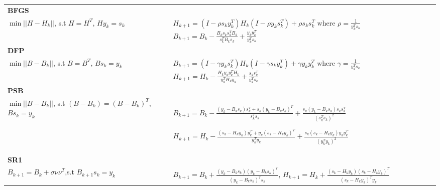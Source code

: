 \documentclass[a0]{a0poster}
\newcommand{\lt}{\left}
\newcommand{\rt}{\right}
\newcommand{\fr}{\frac}
\begin{document}
\begin{textblock}{7.0}
\begin{flushleft}
\begin{tabular}{ p{10cm} p{16cm} }
		\multicolumn{2}{l}{\textbf{BFGS}} \\
		
		$\min||H-H_k||$, \newline s.t $H=H^T$, $Hy_k=s_k$ & $H_{k+1} =(I-\rho s_k y_k^T)H_k(I-\rho y_k s_k ^T) + \rho s_k s_k^T$  
															\newline where $\rho = \fr{1}{y_k^Ts_k}$
															\newline $B_{k+1} = B_k - \fr{B_ks_ks_k^TB_k}{s_k^TB_ks_k} + \fr{y_ky_k^T}{y_k^Ts_k}$\\ 
		\multicolumn{2}{l}{\textbf{DFP}} \\
		$\min||B-B_k||$, \newline s.t $B=B^T$, $Bs_k=y_k$& $B_{k+1} =(I-\gamma y_k s_k^T)H_k(I-\gamma  s_k y_k ^T) + \gamma y_k y_k^T$	\newline where $\gamma = \fr{1}{y_k^Ts_k}$
		\newline $H_{k+1} = H_k - \fr{H_k y_k y_k^TH_k}{y_k^T H_k y_k} + \fr{s_k s_k^T}{y_k^Ts_k}$\\
		\multicolumn{2}{l}{\textbf{PSB}} \\
		$\min||B-B_k||$, \newline s.t $\lt(B - B_k\rt)=\lt(B - B_k\rt)^T$, \newline$Bs_k=y_k$&
		$B_{k+1} = B_k - \fr{(y_k - B_ks_k)s_k^T + s_k(y_k - B_ks_k)^T}{s_k^Ts_k} + \fr{s_k(y_k - B_ks_k) s_k s_k^T}{(s_k^Ts_k)^2}$
		
		$H_{k+1} = H_k - \fr{(s_k - H_ky_k)y_k^T + y_k(s_k - H_ky_k)^T}{y_k^Ty_k} + \fr{s_k(s_k - H_ky_k) y_k y_k^T}{(y_k^Ty_k)^2}$\\ 
		\multicolumn{2}{l}{\textbf{SR1}} \\
		$B_{k+1} = B_k + \sigma\nu\nu^T$,\newline s.t $B_{k+1}s_k = y_k$&
		$B_{k+1} = B_k + \fr{(y_k - B_ks_k)(y_k - B_ks_k)^T}{(y_k - B_ks_k)^Ts_k}$,\newline
		$H_{k+1} = H_k + \fr{(s_k - H_ky_k)(s_k - H_k y_k)^T}{(s_k - H_ky_k)^Ty_k}$
	\end{tabular}
\end{flushleft}
\end{textblock}
\end{document}
